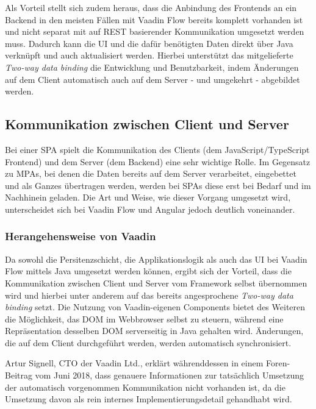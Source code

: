 \documentclass[a4paper,12pt,twoside]{scrreprt}
\begin{document}
Als Vorteil stellt sich zudem heraus, dass die Anbindung des Frontends an ein Backend in den meisten Fällen mit Vaadin Flow bereits komplett vorhanden ist und nicht separat mit auf REST basierender Kommunikation umgesetzt werden muss. Dadurch kann die \acs{UI} und die dafür benötigten Daten direkt über Java verknüpft und auch aktualisiert werden. Hierbei unterstützt das mitgelieferte \textit{Two-way data binding} die Entwicklung und Benutzbarkeit, indem Änderungen auf dem Client automatisch auch auf dem Server - und umgekehrt - abgebildet werden. \parencite[][Framework - Introduction - Overview]{vaadin_ltd_documentation_nodate}

\subsection{Kommunikation zwischen Client und Server}
\label{sub-sec:kommunikation-client-server}
Bei einer \acl{SPA} spielt die Kommunikation des Clients (dem JavaScript/TypeScript Frontend) und dem Server (dem Backend) eine sehr wichtige Rolle. Im Gegensatz zu \aclp{MPA}, bei denen die Daten bereits auf dem Server verarbeitet, eingebettet und als Ganzes übertragen werden, werden bei \acsp{SPA} diese erst bei Bedarf und im Nachhinein geladen. Die Art und Weise, wie dieser Vorgang umgesetzt wird, unterscheidet sich bei Vaadin Flow und Angular jedoch deutlich voneinander.

\subsubsection{Herangehensweise von Vaadin}
\label{sub-sub-sec:kommunikation-herangehensweise-vaadin}
Da sowohl die Persitenzschicht, die Applikationslogik als auch das \acl{UI} bei Vaadin Flow mittels Java umgesetzt werden können, ergibt sich der Vorteil, dass die Kommunikation zwischen Client und Server vom Framework selbst übernommen wird und hierbei unter anderem auf das bereits angesprochene \textit{Two-way data binding} setzt. Die Nutzung von Vaadin-eigenen Components bietet des Weiteren die Möglichkeit, das \acl{DOM} im Webbrowser selbst zu steuern, während eine Repräsentation desselben \acs{DOM} serverseitig in Java gehalten wird. Änderungen, die auf dem Client durchgeführt werden, werden automatisch synchronisiert. \parencite[][Framework - Introduction - Core Concepts]{vaadin_ltd_documentation_nodate}

\medskip

Artur Signell, CTO der Vaadin Ltd., erklärt währenddessen in einem Foren-Beitrag vom Juni 2018, dass genauere Informationen zur tatsächlich Umsetzung der automatisch vorgenommen Kommunikation nicht vorhanden ist, da die Umsetzung davon als rein internes Implementierungsdetail gehandhabt wird. \parencite[][]{signell_explanation_2018}
\end{document}
